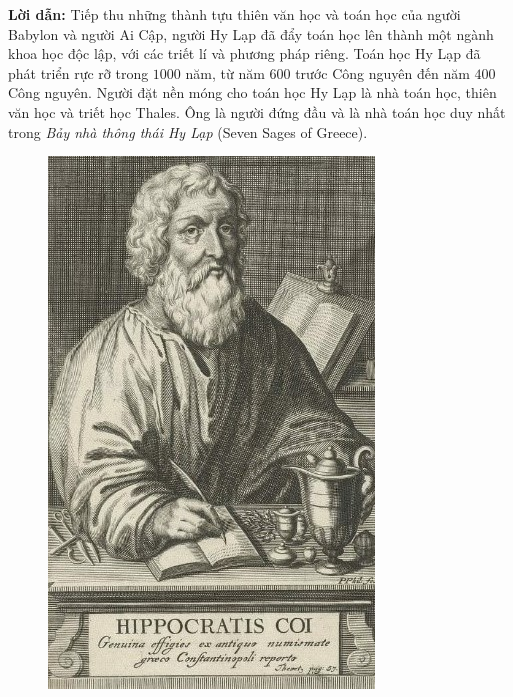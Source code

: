 \begin{multicols}{2}
	\textbf{Lời dẫn:} Tiếp thu những thành tựu thiên văn học và toán học của người Babylon và người Ai Cập, người Hy Lạp đã đẩy toán học lên thành một ngành khoa học độc lập, với các triết lí và phương pháp riêng. Toán học Hy Lạp đã phát triển rực rỡ trong $1000$ năm, từ năm $600$ trước Công nguyên đến năm $400$ Công nguyên. Người đặt nền móng cho toán học Hy Lạp là nhà toán học, thiên văn học và triết học Thales. Ông là người đứng đầu và là nhà toán học duy nhất trong \textit{Bảy nhà thông thái Hy Lạp} (Seven Sages of Greece).
		\begin{figure}[H]
		\centering
		\vspace*{-5pt}
		\captionsetup{labelformat= empty, justification=centering}
		\includegraphics[width=1\linewidth]{1}

\end{figure}
\end{multicols}
